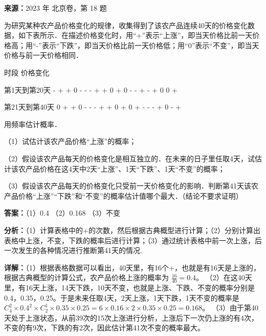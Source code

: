 \begin{question}[points=13]
\textbf{来源：}2023 年 北京卷，第 18 题\par
为研究某种农产品价格变化的规律，收集得到了该农产品连续40天的价格变化数据，如下表所示．在描述价格变化时，用“+”表示“上涨”，即当天价格比前一天价格高；用“-”表示“下跌”，即当天价格比前一天价格低；用“0”表示“不变”，即当天价格与前一天价格相同．



时段                                                  价格变化



第1天到第20天     -  +  +  0  -  -  -  +  +  0  +  0  -  -  +  -  +  0  0  +



第21天到第40天     0  +  +  0  -  -  -  +  +  0  +  0  +  -  -  -  +  0  -  +



用频率估计概率．

（1）试估计该农产品价格“上涨”的概率；

（2）假设该农产品每天的价格变化是相互独立的．在未来的日子里任取4天，试估计该农产品价格在这4天中2天“上涨”、1天“下跌”、1天“不变”的概率；

（3）假设该农产品每天的价格变化只受前一天价格变化的影响．判断第41天该农产品价格“上涨”“下跌”和“不变”的概率估计值哪个最大．（结论不要求证明）
\begin{solution}
\textbf{答案：}（1）0.4 （2）0.168 （3）不变

\textbf{分析：}（1）计算表格中的+的次数，然后根据古典概型进行计算；（2）分别计算出表格中上涨，不变，下跌的概率后进行计算；（3）通过统计表格中前一次上涨，后一次发生的各种情况进行推断第41天的情况.

\textbf{详解：}（1）根据表格数据可以看出，40天里，有16个+，也就是有16天是上涨的，根据古典概型的计算公式，农产品价格上涨的概率为 $\frac{16}{40}=0.4$。
（2）在这40天里，有16天上涨，14天下跌，10天不变，也就是上涨、下跌、不变的概率分别是0.4，0.35，0.25。于是未来任取4天，2天上涨，1天下跌，1天不变的概率是 $C_4^2 \times 0.4^2 \times C_2^1 \times 0.35 \times 0.25 = 6 \times 0.16 \times 2 \times 0.35 \times 0.25 = 0.168$。
（3）由于第40天处于上涨状态，从前39次的15次上涨进行分析，上涨后下一次仍上涨的有4次，不变的有9次，下跌的有2次，因此估计第41次不变的概率最大。
\end{solution}
\end{question}


